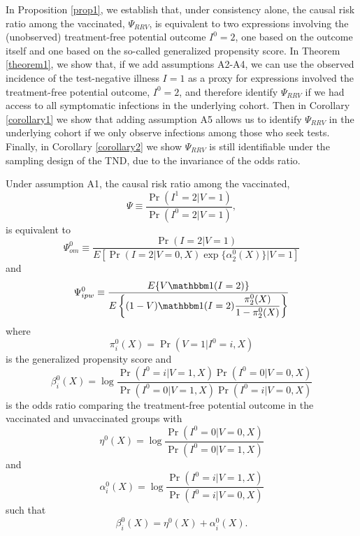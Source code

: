 \begin{appendix}
    In Proposition \ref{prop1}, we establish that, under consistency alone, the causal risk ratio among the vaccinated, $\Psi_{RRV}$, is equivalent to two expressions involving the (unobserved) treatment-free potential outcome $I^0 = 2$, one based on the outcome itself and one based on the so-called generalized propensity score. In Theorem \ref{theorem1}, we show that, if we add assumptions A2-A4, we can use the observed incidence of the test-negative illness $I = 1$ as a proxy for expressions involved the treatment-free potential outcome, $I^0 = 2$, and therefore identify $\Psi_{RRV}$ if we had access to all symptomatic infections in the underlying cohort. Then in Corollary \ref{corollary1} we show that adding assumption A5 allows us to identify $\Psi_{RRV}$ in the underlying cohort if we only observe infections among those who seek tests. Finally, in Corollary \ref{corollary2} we show $\Psi_{RRV}$ is still identifiable under the sampling design of the TND, due to the invariance of the odds ratio. 
    
    \newpage
    \begin{proposition}\label{prop1}
    Under assumption A1, the causal risk ratio among the vaccinated, 
    \begin{equation*}
        \Psi \equiv \dfrac{\Pr(I^1=2|V=1)}{\Pr(I^0=2|V=1)},
    \end{equation*}
    is equivalent to 
    \begin{equation}
        \Psi^0_{om} \equiv \dfrac{\Pr(I = 2 | V = 1)}{E\left[\Pr(I = 2 | V = 0, X) \exp\{\alpha^0_2(X)\}\Big| V = 1 \right]}
    \end{equation}
    and 
    \begin{equation}
        \Psi^0_{ipw} \equiv \dfrac{E\{V \mathbbm 1(I = 2)\}}{E\left\{ (1 - V) \mathbbm 1(I = 2) \dfrac{\pi^0_2(X)}{1 - \pi^0_2(X)}\right\}}
    \end{equation}
    where 
    \begin{equation*}
        \pi^0_i(X) = \Pr(V = 1 | I^0 = i, X)
    \end{equation*}
    is the generalized propensity score and 
    \begin{equation*}
        \beta^0_i(X) = \log \dfrac{\Pr(I^0 = i | V = 1, X)\Pr(I^0 = 0 | V = 0, X)}{\Pr(I^0 = 0 | V = 1, X)\Pr(I^0 = i | V = 0, X)}
    \end{equation*}
    is the odds ratio comparing the treatment-free potential outcome in the vaccinated and unvaccinated groups with 
    \begin{equation*}
        \eta^0(X) = \log \dfrac{\Pr(I^0 = 0 | V = 0, X)}{\Pr(I^0 = 0 | V = 1, X)}
    \end{equation*}
    and 
    \begin{equation*}
        \alpha^0_i(X) = \log \dfrac{\Pr(I^0 = i | V = 1, X)}{\Pr(I^0 = i | V = 0, X)}
    \end{equation*}
    such that
    \begin{equation*}
        \beta^0_i(X) = \eta^0(X) + \alpha^0_i(X).
    \end{equation*}
    \end{proposition}
    

\end{appendix}
